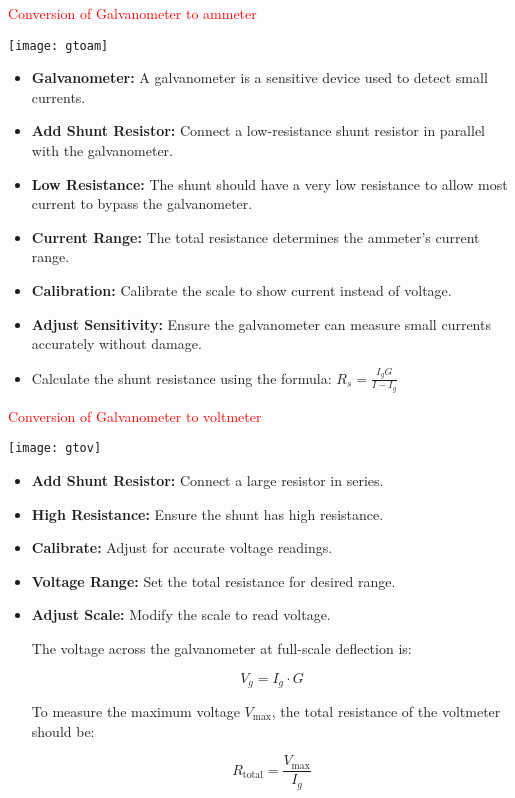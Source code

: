 \documentclass{beamer}
\begin{document}
\begin{frame}
\textcolor{red}{Conversion of Galvanometer to ammeter}
\begin{center}
\texttt{[image: gtoam]}
\end{center}

\begin{itemize}
\item \textbf{Galvanometer:} A galvanometer is a sensitive device used to detect small currents.
\item \textbf{Add Shunt Resistor:} Connect a low-resistance shunt resistor in parallel with the galvanometer.
\item \textbf{Low Resistance:} The shunt should have a very low resistance to allow most current to bypass the galvanometer.
\item \textbf{Current Range:} The total resistance determines the ammeter’s current range.
\item \textbf{Calibration:} Calibrate the scale to show current instead of voltage.
\item \textbf{Adjust Sensitivity:} Ensure the galvanometer can measure small currents accurately without damage.
\item Calculate the shunt resistance using the formula:
$R_s=\frac{I_g G}{I-I_g}$
\end{itemize}

\end{frame}

\begin{frame}
\textcolor{red}{Conversion of Galvanometer to voltmeter}
\begin{center}
\texttt{[image: gtov]}
\end{center}
\begin{itemize}

\item \textbf{Add Shunt Resistor:} Connect a large resistor in series.
\item \textbf{High Resistance:} Ensure the shunt has high resistance.
\item \textbf{Calibrate:} Adjust for accurate voltage readings.
\item \textbf{Voltage Range:} Set the total resistance for desired range.
\item \textbf{Adjust Scale:} Modify the scale to read voltage.

The voltage across the galvanometer at full-scale deflection is:

\[
V_g = I_g \cdot G
\]

To measure the maximum voltage \( V_{\text{max}} \), the total resistance of the voltmeter should be:

\[
R_{\text{total}} = \frac{V_{\text{max}}}{I_g}
\]


\end{itemize}

\end{frame}
\end{document}
